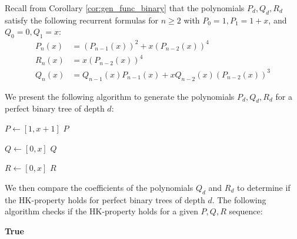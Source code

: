 \documentclass[10pt]{amsart}
\theoremstyle{definition}
\begin{document}
\begin{appendix}
	Recall from Corollary \ref{cor:gen_func_binary} that the polynomials $P_d, Q_d, R_d$ satisfy the following recurrent formulas for $n\geq 2$ with $P_{0}=1, P_1=1+x$, and $Q_{0}=0, Q_1=x$:
	\begin{align*}
		P_n(x) & = (P_{n - 1}(x))^2 + x(P_{n - 2}(x))^4                     \\
		R_n(x) & = x(P_{n - 2}(x))^4                                        \\
		Q_n(x) & = Q_{n - 1}(x)P_{n - 1}(x) + xQ_{n - 2}(x)(P_{n - 2}(x))^3
	\end{align*}

	We present the following algorithm to generate the polynomials $P_d, Q_d, R_d$ for a perfect binary tree of depth $d$:

	\begin{algorithm}[H]
		\caption{Generate $P$ Sequence}
		$P \gets [1, x+1]$\;
		\Return $P$
	\end{algorithm}

	\begin{algorithm}[H]
		\caption{Generate $Q$ Sequence}
		$Q \gets [0, x]$\;
		\Return $Q$
	\end{algorithm}

	\begin{algorithm}[H]
		\caption{Generate $R$ Sequence}
		$R \gets [0, x]$\;
		\Return $R$
	\end{algorithm}

	\vspace{1cm}
	We then compare the coefficients of the polynomials $Q_d$ and $R_d$ to determine if the HK-property holds for perfect binary trees of depth $d$. The following algorithm checks if the HK-property holds for a given $P, Q, R$ sequence:
	\newline

	\begin{algorithm}[H]
		\caption{Check HK-Property}
		\Return \textbf{True}
	\end{algorithm}


\end{appendix}
\end{document}
